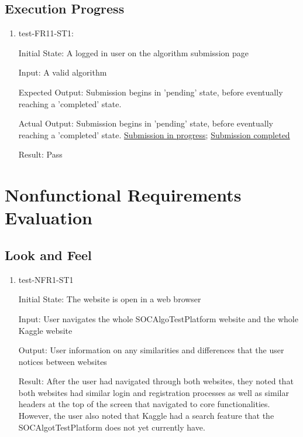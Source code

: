 \documentclass[12pt, titlepage]{article}
\begin{document}
\subsection{Execution Progress}
\begin{enumerate}
    \item test-FR11-ST1:\label{test-FR11-ST1}
    
    Initial State: A logged in user on the algorithm submission page
    
    Input: A valid algorithm
    
    Expected Output: Submission begins in 'pending' state, before eventually reaching a 'completed' state.
    
    Actual Output: Submission begins in 'pending' state, before eventually reaching a 'completed' state. \href{https://github.com/AidanMariglia/SOCAlgoTestPlatform/blob/main/docs/VnVReport/images/submission_pending.png}{Submission in progress}; \href{https://github.com/AidanMariglia/SOCAlgoTestPlatform/blob/main/docs/VnVReport/images/submission_completed.png}{Submission completed} 
    
    Result: Pass
\end{enumerate}
\section{Nonfunctional Requirements Evaluation}

\subsection{Look and Feel}
\begin{enumerate}

\item{test-NFR1-ST1} \label{test-NFR1-ST1}

Initial State: The website is open in a web browser

Input: User navigates the whole SOCAlgoTestPlatform website and the whole Kaggle website

Output: User information on any similarities and differences that the user notices between websites

Result: After the user had navigated through both websites, they noted that both websites had similar login and registration processes as well as similar headers at the top of the screen that navigated to core functionalities. However, the user also noted that Kaggle had a search feature that the SOCAlgotTestPlatform does not yet currently have. 
\end{enumerate}
		
\end{document}
